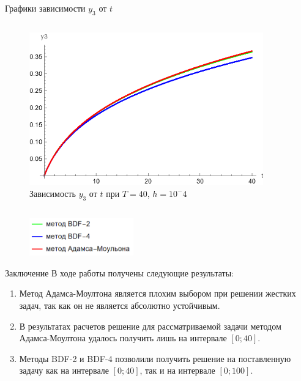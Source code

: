 \documentclass[ignoreonframetext,unicode]{beamer}
\begin{document}
\begin{frame}{Графики зависимости $y_3$ от $t$}
\begin{columns}
		\begin{figure}[!htbp]
			\centering
			\includegraphics[width=0.9\textwidth]{T-40-s1000-3}%
			\caption{Зависимость $y_3$ от $t$ при $T = 40$, $h = 10^-4$}
			\vspace*{-2mm}
			\label{T-40-s1000-3}
		\end{figure}

	\end{columns}

	\begin{figure}[!htbp]
	\centering
	\includegraphics[width=0.4\textwidth]{graph-legend}
	\end{figure}
\end{frame}

\begin{frame}{Заключение}
	В ходе работы получены следующие результаты:
	\begin{block}{}
	\begin{enumerate}	
		\item Метод Адамса-Моултона является плохим выбором при решении жестких задач, так как он не является абсолютно устойчивым.
		\item В результатах расчетов решение для рассматриваемой задачи методом Адамса-Моултона удалось получить лишь на интервале $[0; 40]$.
		\item 
		Методы BDF-2 и BDF-4 позволили получить решение на поставленную задачу  как на интервале $[0; 40]$, так и на интервале $[0; 100]$.
	\end{enumerate}
	\end{block}	
\end{frame}	
\end{document}
